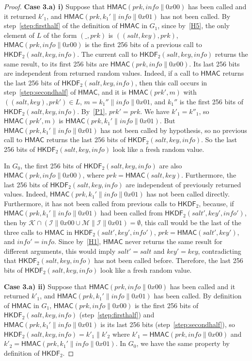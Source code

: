 \documentclass[compsoc, conference, letterpaper, 10pt, times]{IEEEtran}
\newcommand{\HKDF}{\mathsf{HKDF}}
\newcommand{\hkdftwo}{\HKDF_2}
\newcommand{\salt}{\mathit{salt}}
\newcommand{\key}{\mathit{key}}
\newcommand{\info}{\mathit{info}}
\newcommand{\prk}{\mathit{prk}}
\newcommand{\hmac}{\mathsf{HMAC}}
\newcommand{\Skey}{\mathcal{K}}
\newcommand{\Sinfo}{\mathcal{I}}
\newcommand{\Smac}{\mathcal{M}}
\begin{document}
\begin{proof}
{\bf Case 3.a) i)}
 Suppose that $\hmac(\prk, \info\|0x00)$ has been called and it returned $k'_1$,
  and $\hmac(\prk, k_1'\|\info\|0x01)$ has not been called.
  By step~\ref{step:firsthalf} of the definition of $\hmac$ in $G_1$, since by~\ref{H5}, the only element of $L$ of the form $(\_,\prk)$ is
  $((\salt,\key),\prk)$, %
  $\hmac(\prk, \info\|0x00)$ is the first 256 bits
  of a previous call to $\hkdftwo(\salt,\key,\info)$. The current call to
  $\hkdftwo(\salt,\key,\info)$ returns the same result, to its first 256 bits
  are $\hmac(\prk, \info\|0x00)$. Its last 256 bits are independent from returned
  random values. Indeed, if a call to $\hmac$ returns the last 256 bits of $\hkdftwo(\salt,\key,\info)$, then this call occurs in step~\ref{step:secondhalf} of $\hmac$, and it is $\hmac(\prk', m)$ with $((\salt,\key),\prk') \in L$, $m = k_1'' \|\info \|0x01$, and $k_1''$ is the first 256 bits of $\hkdftwo(\salt,\key,\info)$. By~\ref{P1}, $\prk'= \prk$. We have $k'_1 = k''_1$, so $\hmac(\prk', m)$ is $\hmac(\prk, k_1'\|\info\|0x01)$. But $\hmac(\prk, k_1'\|\info\|0x01)$ has not been called by hypothesis, so no previous call to $\hmac$ returns the last 256 bits of $\hkdftwo(\salt,\key,\info)$. So the last 256 bits of $\hkdftwo(\salt,\key,\info)$ look like a fresh random value.

  In $G_0$, the first 256 bits of $\hkdftwo(\salt,\key,\info)$ are also  $\hmac(\prk, \info\|0x00)$, where $\prk = \hmac(\salt,\key)$. Furthermore, the last 256 bits of $\hkdftwo(\salt,\key,\info)$ are independent of previously returned values. Indeed, $\hmac(\prk, k_1'\|\info\|0x01)$ has not been called directly. Furthermore, it has not been called from previous calls to $\hkdftwo$, because, if $\hmac(\prk, k_1'\|\info\|0x01)$ had been called from $\hkdftwo(\salt',\key',\info')$, then by $\Skey \cap (\Sinfo \| 0x00 \cup \Smac \| \Sinfo \| 0x01) = \emptyset$, this call would be the last of the three calls to $\hmac$ in $\hkdftwo(\salt',\key',\info')$, $\prk = \hmac(\salt',\key')$, and $\info' = \info$. Since by~\ref{H1}, $\hmac$ never returns the same result for different arguments, %
this would imply $\salt' = \salt$ and $\key' = \key$, contradicting that $\hkdftwo(\salt,\key,\info)$ has not been called before. Therefore, the last 256 bits of $\hkdftwo(\salt,\key,\info)$ look like a fresh random value.
  
{\bf Case 3.a) ii)}
Suppose that $\hmac(\prk, \info\|0x00)$ has been called and it returned $k'_1$,
  and $\hmac(\prk, k_1'\|\info\|0x01)$ has been called.
  By definition of $\hmac$ in $G_1$, $\hmac(\prk, \info\|0x00)$ is the first 256
  bits of $\hkdftwo(\salt,\key,\info)$ (step~\ref{step:firsthalf}) and $\hmac(\prk, k_1'\|\info\|0x01)$ is
  its last 256 bits (step~\ref{step:secondhalf}), so $\hkdftwo(\salt,\key,\info) = k'_1 \| k'_2$
  where $k'_1 = \hmac(\prk, \info\|0x00)$ and $k'_2 = \hmac(\prk, k_1'\|\info\|0x01)$.
  In $G_0$, we have the same property by definition of $\hkdftwo$.
  

\end{proof}
\end{document}

